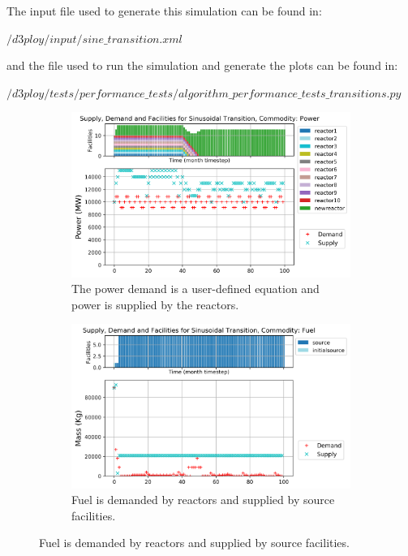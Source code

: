 \documentclass[11pt]{article}
\begin{document}
The input file used to generate this simulation can be found in:

\noindent
$/d3ploy/input/sine\_transition.xml$

\noindent
and the file used to run the simulation and generate the plots can be found in:

\noindent
$/d3ploy/tests/performance\_tests/algorithm\_performance\_tests\_transitions.py$

\begin{figure}[!htbp]
    \centering
    \begin{subfigure}[t]{\textwidth}
    \centering
        \includegraphics[width=0.8\linewidth]{figures/sinetransition-power.png} 
        \caption{The power demand is a user-defined equation and power is supplied by the reactors.}
        \label{fig:sinetransition-power}
    \end{subfigure}
    \begin{subfigure}[t]{0.65\textwidth}
        \centering
        \includegraphics[width=\linewidth]{figures/sinetransition-fuel.png} 
        \caption{Fuel is demanded by reactors and supplied by source facilities.}
	    \label{fig:sinetransition-fuel}
    \end{subfigure}

\end{figure}
\end{document}
